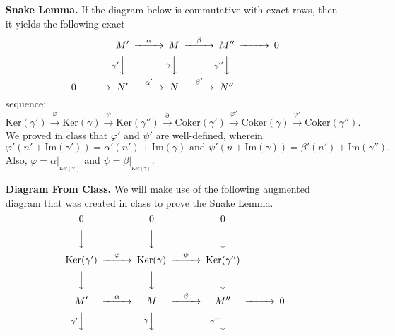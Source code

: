\documentclass[9pt]{article}
\newcommand{\Ker}{\text{Ker}}
\newcommand{\Coker}{\text{Coker}}
\newcommand{\im}{\text{Im}}
\begin{document}
\begin{enumerate}
   \item[\textbf{Snake Lemma.}] If the diagram below is commutative with exact
                                rows, then it yields the following exact
      \begin{equation}\label{5_1}
         \begin{CD}
            @. M' @>\alpha>> M @>\beta>> M'' @>>> 0 \\
            @. @V\gamma'VV @V{\gamma}VV @V\gamma''VV \\
            0 @>>> N' @>\alpha'>> N @>\beta'>> N''
         \end{CD}
      \end{equation}
      sequence:
      \begin{equation} \label{5_2}
         \Ker(\gamma') \stackrel{\varphi}{\rightarrow} \Ker(\gamma)
         \stackrel{\psi}{\rightarrow} \Ker(\gamma'')
         \stackrel{\partial}{\rightarrow} \Coker(\gamma')
         \stackrel{\varphi'}{\rightarrow} \Coker(\gamma)
         \stackrel{\psi'}{\rightarrow} \Coker(\gamma'').
      \end{equation}
      We proved in class that $\varphi'$ and $\psi'$ are well-defined, wherein
      $$\varphi'(n'+\im(\gamma'))=\alpha'(n') + \im(\gamma) \text{ and }
      \psi'(n + \im(\gamma))=\beta'(n') + \im(\gamma'').$$
      Also, $\varphi = \alpha|_{_{\Ker(\gamma')}}$ and
      $\psi = \beta|_{_{\Ker(\gamma)}}$.
\item[\textbf{Diagram From Class.}] We will make use of the following augmented
                                    diagram that was created in class to prove
                                    the Snake Lemma.
      \begin{equation*}
         \begin{CD}
            @. 0             @.          0            @.       0 \\
            @. @VVV                      @VVV                  @VVV \\
            @. \Ker(\gamma') @>\varphi>> \Ker(\gamma) @>\psi>> \Ker(\gamma'') \\
            @. @VVV                      @VVV                  @VVV \\
            @. M'            @>\alpha>>  M            @>\beta>> M'' @>>> 0 \\
            @. @V\gamma'VV                      @V{\gamma}VV   @V\gamma''VV \\

\end{CD}
\end{equation*}
\end{enumerate}
\end{document}
